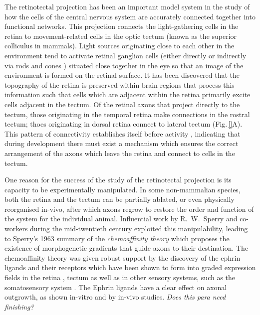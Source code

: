 \documentclass[11pt, a4paper, draft]{article}
\begin{document}
The retinotectal projection has been an important model system in the study of
how the cells of the central nervous system are accurately connected together
into functional networks. This projection connects the light-gathering cells
in the retina to movement-related cells in the optic tectum (known as the
superior colliculus in mammals). Light sources originating close to each other
in the environment tend to activate retinal ganglion cells (either
directly \cite{iRGC_citation} or indirectly via rods and
cones \cite{rods_cones_citations}) situated close together in the eye so that
an image of the environment is formed on the retinal surface. It has been
discovered that the topography of the retina is preserved within brain regions
that process this information such that cells which are adjacent within the
retina primarily excite cells adjacent in the tectum. Of the retinal axons
that project directly to the tectum, those originating in the temporal retina
make connections in the rostral tectum; thoes originating in dorsal retina
connect to lateral tectum (Fig.\,\ref{}A).  This pattern of connectivity
establishes itself before activity \citep{something}, indicating that during
development there must exist a mechanism which ensures the correct arrangement
of the axons which leave the retina and connect to cells in the tectum.

One reason for the success of the study of the retinotectal projection is its
capacity to be experimentally manipulated. In some non-mammalian species, both
the retina and the tectum can be partially ablated, or even physically
reorganised in-vivo, after which axons regrow to restore the order and
function of the system for the individual animal. Influential work by
R.~W.~Sperry and co-workers during the mid-twentieth century exploited this
manipulability, leading to Sperry's 1963 summary of the \emph{chemoaffinity
theory} \citep{sperry_chemoaffinity_1963} which proposes the existence of
morphogenetic gradients that guide axons to their destination. The
chemoaffinity theory was given robust support by the discovery of the ephrin
ligands and their
receptors \citep{cheng_complementary_1995,drescher_vitro_1995} which have been
shown to form into graded expression fields in the
retina \citep{braisted_graded_1997},
tectum \citep{braisted_graded_1997,feldheim_genetic_2000} as well as in other
sensory systems, such as the somatosensory
system \citep{vanderhaeghen_mapping_2000}. The Ephrin ligands have a clear
effect on axonal outgrowth, as shown
in-vitro \citep{cheng_complementary_1995,drescher_vitro_1995,hansen_retinal_2004}
and by
in-vivo \citep{frisen_ephrin-a5_1998,rodger_transient_2000,mann_topographic_2002,hindges_ephb_2002}
studies. \emph{Does this para need finishing?}
%
%
%
%
%
%
%
%
\end{document}
